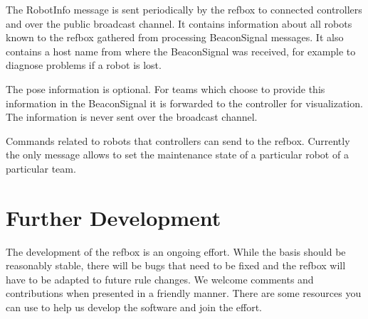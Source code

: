 \documentclass[a4paper]{article}
\begin{document}



%
{%
  The RobotInfo message is sent periodically by the refbox to
  connected controllers and over the public broadcast channel. It
  contains information about all robots known to the refbox gathered
  from processing BeaconSignal messages. It also contains a host name
  from where the BeaconSignal was received, for example to diagnose
  problems if a robot is lost.

  \medskip
  The pose information is optional. For teams which choose to provide
  this information in the BeaconSignal it is forwarded to the
  controller for visualization. The information is never sent over the
  broadcast channel.
}

%
{%
  Commands related to robots that controllers can send to the
  refbox. Currently the only message allows to set the maintenance
  state of a particular robot of a particular team.
}

\section{Further Development}
\label{sec:dev}
The development of the refbox is an ongoing effort. While the basis
should be reasonably stable, there will be bugs that need to be fixed
and the refbox will have to be adapted to future rule changes. We
welcome comments and contributions when presented in a friendly
manner. There are some resources you can use to help us develop the
software and join the effort.
\end{document}

